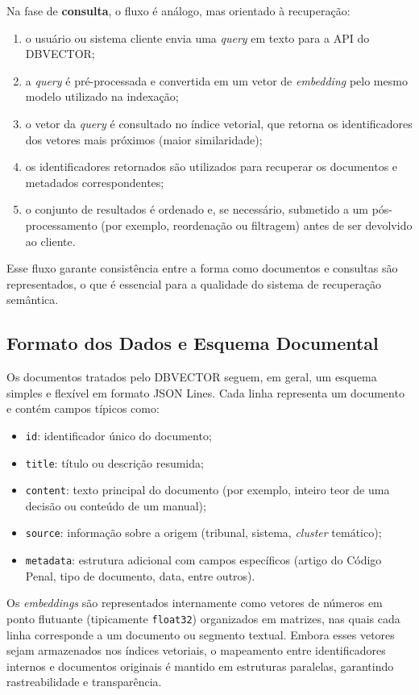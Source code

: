 Na fase de \textbf{consulta}, o fluxo é análogo, mas orientado à recuperação:

\begin{enumerate}
  \item o usuário ou sistema cliente envia uma \textit{query} em texto para a API do DBVECTOR;
  \item a \textit{query} é pré-processada e convertida em um vetor de \textit{embedding} pelo mesmo modelo utilizado na indexação;
  \item o vetor da \textit{query} é consultado no índice vetorial, que retorna os identificadores dos vetores mais próximos (maior similaridade);
  \item os identificadores retornados são utilizados para recuperar os documentos e metadados correspondentes;
  \item o conjunto de resultados é ordenado e, se necessário, submetido a um pós-processamento (por exemplo, reordenação ou filtragem) antes de ser devolvido ao cliente.
\end{enumerate}

Esse fluxo garante consistência entre a forma como documentos e consultas são representados, o que é essencial para a qualidade do sistema de recuperação semântica.

\subsection{Formato dos Dados e Esquema Documental}
Os documentos tratados pelo DBVECTOR seguem, em geral, um esquema simples e flexível em formato JSON Lines. Cada linha representa um documento e contém campos típicos como:

\begin{itemize}
  \item \texttt{id}: identificador único do documento;
  \item \texttt{title}: título ou descrição resumida;
  \item \texttt{content}: texto principal do documento (por exemplo, inteiro teor de uma decisão ou conteúdo de um manual);
  \item \texttt{source}: informação sobre a origem (tribunal, sistema, \textit{cluster} temático);
  \item \texttt{metadata}: estrutura adicional com campos específicos (artigo do Código Penal, tipo de documento, data, entre outros).
\end{itemize}

Os \textit{embeddings} são representados internamente como vetores de números em ponto flutuante (tipicamente \texttt{float32}) organizados em matrizes, nas quais cada linha corresponde a um documento ou segmento textual. Embora esses vetores sejam armazenados nos índices vetoriais, o mapeamento entre identificadores internos e documentos originais é mantido em estruturas paralelas, garantindo rastreabilidade e transparência.

